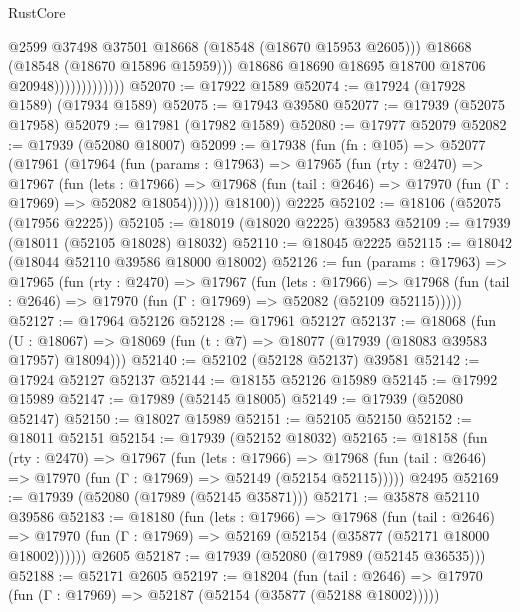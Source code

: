 \begin{lexlean}{RustCore}
\begin{coremodule}
                                  @2599
                                  @37498
                                  @37501
                                  @18668
                                  (@18548 (@18670 @15953 @2605)))
                                @18668
                                (@18548 (@18670 @15896 @15959)))
                              @18686
                              @18690
                              @18695
                              @18700
                              @18706
                              @20948)))))))))))))
@52070 := @17922 @1589
@52074 := @17924 (@17928 @1589) (@17934 @1589)
@52075 := @17943 @39580
@52077 := @17939 (@52075 @17958)
@52079 := @17981 (@17982 @1589)
@52080 := @17977 @52079
@52082 := @17939 (@52080 @18007)
@52099 := @17938
    (fun (fn : @105) =>
    @52077
      (@17961
        (@17964
          (fun (params : @17963) =>
          @17965
            (fun (rty : @2470) =>
            @17967
              (fun (lets : @17966) =>
              @17968 (fun (tail : @2646) => @17970 (fun (Γ : @17969) => @52082 @18054))))))
        @18100))
    @2225
@52102 := @18106 (@52075 (@17956 @2225))
@52105 := @18019 (@18020 @2225) @39583
@52109 := @17939 (@18011 (@52105 @18028) @18032)
@52110 := @18045 @2225
@52115 := @18042 (@18044 @52110 @39586 @18000 @18002)
@52126 := fun (params : @17963) =>
  @17965
    (fun (rty : @2470) =>
    @17967
      (fun (lets : @17966) =>
      @17968 (fun (tail : @2646) => @17970 (fun (Γ : @17969) => @52082 (@52109 @52115)))))
@52127 := @17964 @52126
@52128 := @17961 @52127
@52137 := @18068
    (fun (U : @18067) => @18069 (fun (t : @7) => @18077 (@17939 (@18083 @39583 @17957) @18094)))
@52140 := @52102 (@52128 @52137) @39581
@52142 := @17924 @52127 @52137
@52144 := @18155 @52126 @15989
@52145 := @17992 @15989
@52147 := @17989 (@52145 @18005)
@52149 := @17939 (@52080 @52147)
@52150 := @18027 @15989
@52151 := @52105 @52150
@52152 := @18011 @52151
@52154 := @17939 (@52152 @18032)
@52165 := @18158
    (fun (rty : @2470) =>
    @17967
      (fun (lets : @17966) =>
      @17968 (fun (tail : @2646) => @17970 (fun (Γ : @17969) => @52149 (@52154 @52115)))))
    @2495
@52169 := @17939 (@52080 (@17989 (@52145 @35871)))
@52171 := @35878 @52110 @39586
@52183 := @18180
    (fun (lets : @17966) =>
    @17968
      (fun (tail : @2646) =>
      @17970 (fun (Γ : @17969) => @52169 (@52154 (@35877 (@52171 @18000 @18002))))))
    @2605
@52187 := @17939 (@52080 (@17989 (@52145 @36535)))
@52188 := @52171 @2605
@52197 := @18204
    (fun (tail : @2646) => @17970 (fun (Γ : @17969) => @52187 (@52154 (@35877 (@52188 @18002)))))

\end{coremodule}
\end{lexlean}
